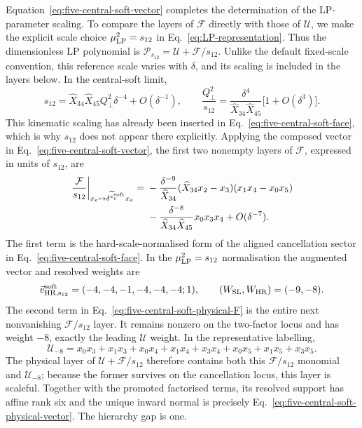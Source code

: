 \documentclass[a4paper,11pt]{article}
\newcommand{\WSL}{W_{\rm SL}}
\newcommand{\WHR}{W_{\rm HR}}
\begin{document}
Equation~\eqref{eq:five-central-soft-vector} completes the determination of
the LP-parameter scaling.  To compare the layers of \(\mathcal F\) directly
with those of \(\mathcal U\), we make the explicit scale choice
\(\mu_{\rm LP}^2=s_{12}\) in Eq.~\eqref{eq:LP-representation}.  Thus the
dimensionless LP polynomial is
\(\mathcal P_{s_{12}}=\mathcal U+\mathcal F/s_{12}\).  Unlike the default
fixed-scale convention, this reference scale varies with \(\delta\), and its
scaling is included in the layers below.  In the central-soft limit,
\[
 s_{12}=\widehat X_{34}\widehat X_{45}Q_\perp^2\delta^{-4}
 +O(\delta^{-1}),
 \qquad
 \frac{Q_\perp^2}{s_{12}}
 =\frac{\delta^4}{\widehat X_{34}\widehat X_{45}}
  \bigl[1+O(\delta^3)\bigr].
\]
This kinematic scaling has already been inserted in
Eq.~\eqref{eq:five-central-soft-face}, which is why \(s_{12}\) does not
appear there explicitly.  Applying the composed vector in
Eq.~\eqref{eq:five-central-soft-vector}, the first two nonempty layers of
\(\mathcal F\), expressed in units of \(s_{12}\), are
\begin{align}
 \left.\frac{\mathcal F}{s_{12}}\right|_{
 x_e\mapsto\delta^{\widetilde v_e^{\rm soft}}x_e}
 ={}&
 -\frac{\delta^{-9}}{\widehat X_{34}}
  (\widehat X_{34}x_2-x_3)(x_1x_4-x_0x_5)\nonumber\\
 &-\frac{\delta^{-8}}{\widehat X_{34}\widehat X_{45}}
  x_0x_3x_4+O(\delta^{-7}).
 \label{eq:five-central-soft-physical-F}
\end{align}
The first term is the hard-scale-normalised form of the aligned cancellation
sector in Eq.~\eqref{eq:five-central-soft-face}.  In the
\(\mu_{\rm LP}^2=s_{12}\) normalisation the augmented vector and resolved
weights are
\begin{equation}
 \vec v_{\rm HR,s_{12}}^{\rm soft}
 =(-4,-4,-1,-4,-4,-4;1),
 \qquad (\WSL,\WHR)=(-9,-8).
 \label{eq:five-central-soft-physical-vector}
\end{equation}
The second term in Eq.~\eqref{eq:five-central-soft-physical-F} is the entire
next nonvanishing \(\mathcal F/s_{12}\) layer.  It remains nonzero on the
two-factor locus and has weight \(-8\), exactly the leading
\(\mathcal U\) weight.  In the representative labelling,
\begin{equation}
 \mathcal U_{-8}=x_0x_3+x_1x_3+x_0x_4+x_1x_4+x_3x_4
                 +x_0x_5+x_1x_5+x_3x_5.
 \label{eq:five-central-soft-U}
\end{equation}
The physical layer of \(\mathcal U+\mathcal F/s_{12}\) therefore contains
both this \(\mathcal F/s_{12}\) monomial and \(\mathcal U_{-8}\); because the
former survives on the cancellation locus, this layer is scaleful.  Together
with the promoted factorised terms, its resolved support has affine rank six
and the unique inward normal is precisely
Eq.~\eqref{eq:five-central-soft-physical-vector}.  The hierarchy gap is one.
\end{document}
